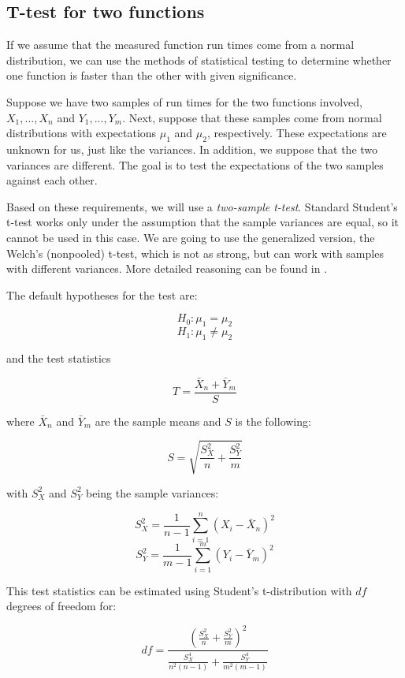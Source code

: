 \subsection{T-test for two functions}
\label{subsec:t_test_two}

If we assume that the measured function run times come from a normal distribution, we can use the methods of statistical testing to determine whether one function is faster than the other with given significance. 

Suppose we have two samples of run times for the two functions involved, $X_1, ..., X_n$ and $Y_1, ..., Y_m$. Next, suppose that these samples come from normal distributions with expectations $\mu_1$ and $\mu_2$, respectively. These expectations are unknown for us, just like the variances. In addition, we suppose that the two variances are different. The goal is to test the expectations of the two samples against each other.

Based on these requirements, we will use a \textit{two-sample t-test}. Standard Student's t-test works only under the assumption that the sample variances are equal, so it cannot be used in this case. We are going to use the generalized version, the Welch's (nonpooled) t-test, which is not as strong, but can work with samples with different variances. More detailed reasoning can be found in \cite{welch_generalisation_1947}.

The default hypotheses for the test are:

\[
H_0: \mu_1 = \mu_2
\]
\[
H_1: \mu_1 \ne  \mu_2
\]

and the test statistics

\[
T = \frac{\bar{X}_n + \bar{Y}_m}{S}
\]

where $\bar{X}_n$ and $\bar{Y}_m$ are the sample means and $S$ is the following:

\[
S = \sqrt{\frac{S_X^2}{n} + \frac{S_Y^2}{m}}
\]

with $S_X^2$ and $S_Y^2$ being the sample variances:

\[
S_X^2 = \frac{1}{n-1} \sum_{i=1}^{n}(X_i - \bar{X}_n)^2
\]
\[
S_Y^2 = \frac{1}{m-1} \sum_{i=1}^{m}(Y_i - \bar{Y}_m)^2
\]

This test statistics can be estimated using Student's t-distribution with $df$ degrees of freedom for:

\[
df = \frac{(\frac{S_X^2}{n} + \frac{S_Y^2}{m})^2}{\frac{S_X^4}{n^2(n - 1)} + \frac{S_Y^4}{m^2(m - 1)}}
\]

